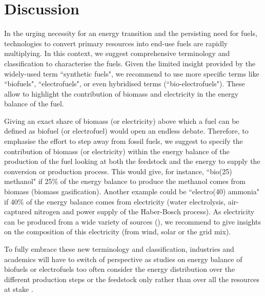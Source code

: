 \section{Discussion}
\label{sec:discussion}
In the urging necessity for an energy transition and the persisting need for fuels, technologies to convert primary resources into end-use fuels are rapidly multiplying. In this context, we suggest comprehensive terminology and classification to characterise the fuels. Given the limited insight provided by the widely-used term ``synthetic fuels", we recommend to use more specific terms like ``biofuels", ``electrofuels", or even hybridised terms (\eg ``bio-electrofuels"). These allow to highlight the contribution of biomass and electricity in the energy balance of the fuel.

Giving an exact share of biomass (or electricity) above which a fuel can be defined as biofuel (or electrofuel) would open an endless debate. Therefore, to emphasise the effort to step away from fossil fuels, we suggest to specify the contribution of biomass (or electricity) within the energy balance of the production of the fuel looking at both the feedstock and the energy to supply the conversion or production process. This would give, for instance, ``bio(25) methanol" if 25\% of the energy balance to produce the methanol comes from biomass (\eg biomass gasification). Another example could be ``electro(40) ammonia" if 40\% of the energy balance comes from electricity (\eg water electrolysis, air-captured nitrogen and power supply of the Haber-Bosch process). As electricity can be produced from a wide variety of sources (), we recommend to give insights on the composition of this electricity (\eg from wind, solar or the grid mix). 

To fully embrace these new terminology and classification, industries and academics will have to switch of perspective as studies on energy balance of biofuels or electrofuels too often consider the energy distribution over the different production steps or the feedstock only rather than over all the resources at stake \cite{OConnell2019,slade2013micro}.




